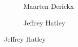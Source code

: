 \begin{frame}[plain]
\begin{figure}[h]
\begin{subfigure}{0.30\textwidth}
	\caption{\scriptsize Maarten Derickx}
	\end{subfigure}
	\begin{subfigure}{0.30\textwidth}
	\captionsetup{labelformat=empty}
	\centering
	\caption{\scriptsize Jeffrey Hatley}
	\end{subfigure}
	\end{figure}
\end{frame}




